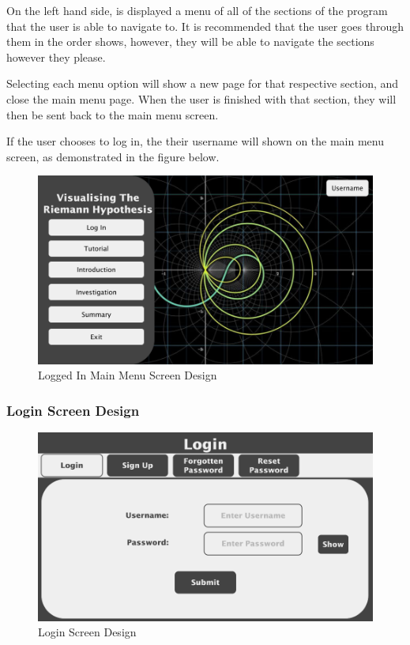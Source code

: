 \documentclass[12pt]{article}
\begin{document}
On the left hand side, is displayed a menu of all of the sections of the program that the user is able to navigate to. It is recommended that the user goes through them in the order shows, however, they will be able to navigate the sections however they please.

Selecting each menu option will show a new page for that respective section, and close the main menu page. When the user is finished with that section, they will then be sent back to the main menu screen.

If the user chooses to log in, the their username will shown on the main menu screen, as demonstrated in the figure below.

\begin{figure}[h]
    \centering
    \includegraphics[scale=0.2]{main-menu-logged-in-screen-design}
    \caption{Logged In Main Menu Screen Design}
\end{figure}

\clearpage

\subsubsection{Login Screen Design}

\begin{figure}[ht]
    \centering
    \includegraphics[scale=0.3]{login-screen-design}
    \caption{Login Screen Design}
\end{figure}
\end{document}
